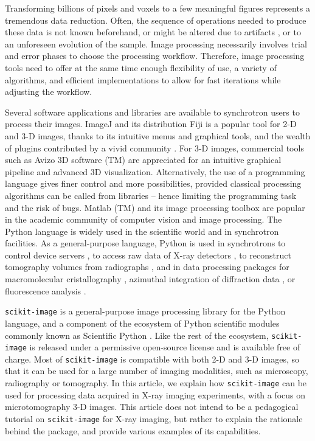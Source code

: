 \documentclass[twocolumn]{bmcart}%
\begin{document}
Transforming billions of pixels and voxels to a few meaningful figures
represents a tremendous data reduction. Often, the sequence of operations
needed to produce these data is not known beforehand, or might be altered
due to artifacts \citep{Marone2010}, or to an unforeseen evolution of
the sample. Image processing necessarily involves trial and error phases
to choose the processing workflow. Therefore, image processing tools need
to offer at the same time enough flexibility of use, a variety of
algorithms, and efficient implementations to allow for fast iterations
while adjusting the workflow.

Several software applications and libraries are available to synchrotron
users to process their images. ImageJ \citep{Abramoff2004, Schneider2012}
and its distribution Fiji \citep{Schindelin2012} is a popular tool for
2-D and 3-D images, thanks to its intuitive menus and graphical tools,
and the wealth of plugins contributed by a vivid
community \citep{Schindelin2015}. For 3-D images, commercial tools such
as Avizo 3D software (TM) are appreciated for an intuitive graphical
pipeline and advanced 3D visualization. Alternatively, the use of a
programming language gives finer control and more possibilities, provided
classical processing algorithms can be called from libraries -- hence
limiting the programming task and the risk of bugs. Matlab (TM) and its
image processing toolbox are popular in the academic community of
computer vision and image processing. The Python language is widely used
in the scientific world and in synchrotron facilities. As a
general-purpose language, Python is used in synchrotrons to control
device servers \citep{pytango}, to access raw data of X-ray
detectors \citep{Knudsen2013}, to reconstruct tomography volumes from
radiographs \citep{Gursoy2014, Mirone2014}, and in data
processing packages for macromolecular cristallography \citep{Adams2010},
azimuthal integration of diffraction data \citep{Ashiotis2015}, or
fluorescence analysis \citep{pymca}.

\texttt{scikit-image} \citep{Vanderwalt2014} is a general-purpose image
processing library for the Python language, and a component of the ecosystem of
Python scientific modules commonly known as Scientific
Python \citep{Oliphant2007}. Like the rest of the ecosystem,
\texttt{scikit-image} is released under a permissive open-source license and is
available free of charge. Most of \texttt{scikit-image} is compatible with both 2-D and
3-D images, so that it can be used for a large number of imaging modalities,
such as microscopy, radiography or tomography. In this article, we explain how
\texttt{scikit-image} can be used for processing data acquired in X-ray
imaging experiments, with a focus on microtomography 3-D images. This
article does not intend to be a pedagogical tutorial on \texttt{scikit-image}
for X-ray imaging, but rather to explain the rationale behind the package, and
provide various examples of its capabilities.
\end{document}
